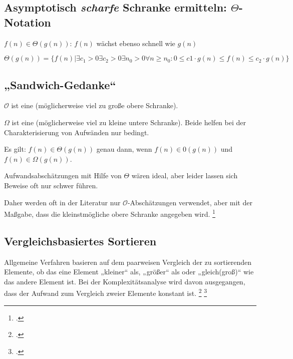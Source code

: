 \documentclass{bschlangaul-theorie}
\begin{document}
\subsection{Asymptotisch \emph{scharfe} Schranke ermitteln: $\Theta$-Notation}

\begin{compactitem}
\item $f(n) \in \Theta(g(n))$: $f(n)$ wächst ebenso schnell wie $g(n)$
\item $\Theta(g(n)) = \{f(n) |
\exists c_1 > 0
\exists c_2 > 0
\exists n_0 > 0
\forall n \geq n_0 :
 0 \leq c 1 \cdot g(n) \leq f(n) \leq c_2 \cdot g(n) \}$
\end{compactitem}

\subsection{„Sandwich-Gedanke“}

\begin{compactitem}
\item $\mathcal{O}$ ist eine (möglicherweise viel zu große obere
Schranke).

\item $\Omega$ ist eine (möglicherweise viel zu kleine untere
Schranke). Beide helfen bei der Charakterisierung von Aufwänden nur
bedingt.

\item  Es gilt: $f(n) \in \Theta(g(n))$ genau dann, wenn $f(n) \in
\mathcal{0}(g(n))$ und $f(n) \in \Omega(g(n))$.

\item Aufwandsabschätzungen mit Hilfe von $\Theta$ wären ideal, aber
leider lassen sich Beweise oft nur schwer führen.
\end{compactitem}

Daher werden oft in der Literatur nur $\mathcal{O}$-Abschätzungen
verwendet, aber mit der Maßgabe, dass die kleinstmögliche obere Schranke
angegeben wird.
\footcite[Seite 37 (PDF 26)]{aud:fs:2}

\subsection{Vergleichsbasiertes Sortieren}

Allgemeine Verfahren basieren auf dem paarweisen Vergleich der zu
sortierenden Elemente, ob das eine Element „kleiner“ als, „größer“ als
oder „gleich(groß)“ wie das andere Element ist. Bei der
Komplexitätsanalyse wird davon ausgegangen, dass der Aufwand zum
Vergleich zweier Elemente konstant ist.
\footcite{wiki:sortierverfahren}
\footcite[Seite 35 (PDF 24)]{aud:fs:2}
\end{document}
